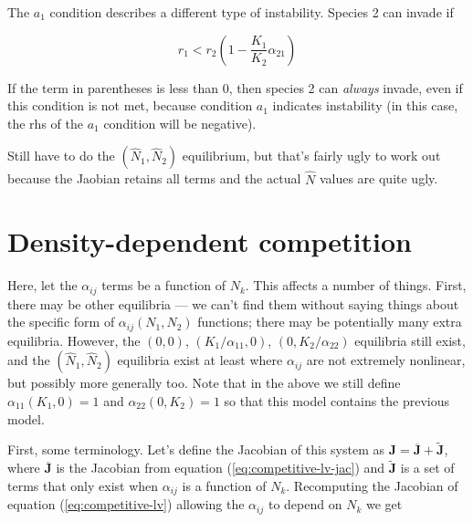 \documentclass[12pt,a4paper]{article}
\begin{document}
The $a_1$ condition describes a different type of instability.
Species 2 can invade if

\begin{equation}
  \label{eq:invasion-a1}
  r_1 < r_2\left(1  - \frac{K_1}{K_2}\alpha_{21}\right)  
\end{equation}

If the term in parentheses is less than 0, then species 2 can
\emph{always} invade, even if this condition is not met, because
condition $a_1$ indicates instability (in this case, the rhs of the
$a_1$ condition will be negative).

Still have to do the $(\hat N_1, \hat N_2)$ equilibrium, but that's
fairly ugly to work out because the Jaobian retains all terms and the
actual $\hat N$ values are quite ugly.

\section{Density-dependent competition}

Here, let the $\alpha_{ij}$ terms be a function of $N_k$.  This
affects a number of things.  First, there may be other equilibria ---
we can't find them without saying things about the specific form of
$\alpha_{ij}(N_1, N_2)$ functions; there may be potentially many extra
equilibria.  However, the $(0,0)$, $(K_1 / \alpha_{11}, 0)$, $(0, K_2
/ \alpha_{22})$ equilibria still exist, and the $(\hat N_1, \hat N_2)$
equilibria exist at least where $\alpha_{ij}$ are not extremely
nonlinear, but possibly more generally too.  Note that in the above we
still define $\alpha_{11}(K_1, 0) = 1$ and $\alpha_{22}(0, K_2) = 1$
so that this model contains the previous model.

First, some terminology.  Let's define the Jacobian of this system as
$\mathbf{J} = \overline{\mathbf{J}} + \widetilde{\mathbf{J}}$, where
$\overline{\mathbf{J}}$ is the Jacobian from equation
(\ref{eq:competitive-lv-jac}) and $\widetilde{\mathbf{J}}$ is a set of
terms that only exist when $\alpha_{ij}$ is a function of $N_k$.
Recomputing the Jacobian of equation (\ref{eq:competitive-lv})
allowing the $\alpha_{ij}$ to depend on $N_k$ we get
\end{document}

